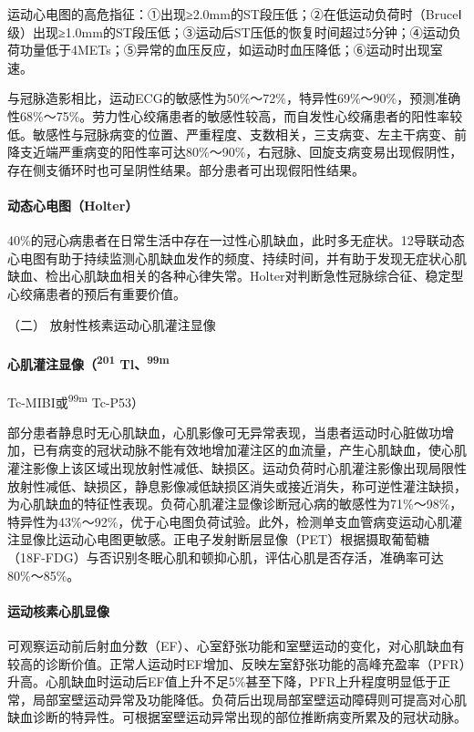 运动心电图的高危指征：①出现≥2.0mm的ST段压低；②在低运动负荷时（BruceⅠ级）出现≥1.0mm的ST段压低；③运动后ST压低的恢复时间超过5分钟；④运动负荷功量低于4METs；⑤异常的血压反应，如运动时血压降低；⑥运动时出现室速。

与冠脉造影相比，运动ECG的敏感性为50\%～72\%，特异性69\%～90\%，预测准确性68\%～75\%。劳力性心绞痛患者的敏感性较高，而自发性心绞痛患者的阳性率较低。敏感性与冠脉病变的位置、严重程度、支数相关，三支病变、左主干病变、前降支近端严重病变的阳性率可达80\%～90\%，右冠脉、回旋支病变易出现假阴性，存在侧支循环时也可呈阴性结果。部分患者可出现假阳性结果。

\paragraph{动态心电图（Holter）}

40\%的冠心病患者在日常生活中存在一过性心肌缺血，此时多无症状。12导联动态心电图有助于持续监测心肌缺血发作的频度、持续时间，并有助于发现无症状心肌缺血、检出心肌缺血相关的各种心律失常。Holter对判断急性冠脉综合征、稳定型心绞痛患者的预后有重要价值。

\hypertarget{text00309.htmlux5cux23CHP10-7-2-2-2}{}
（二） 放射性核素运动心肌灌注显像

\paragraph{心肌灌注显像（\textsuperscript{201} Tl、\textsuperscript{99m}}
Tc-MIBI或\textsuperscript{99m} Tc-P53）

部分患者静息时无心肌缺血，心肌影像可无异常表现，当患者运动时心脏做功增加，已有病变的冠状动脉不能有效地增加灌注区的血流量，产生心肌缺血，使心肌灌注影像上该区域出现放射性减低、缺损区。运动负荷时心肌灌注影像出现局限性放射性减低、缺损区，静息影像减低缺损区消失或接近消失，称可逆性灌注缺损，为心肌缺血的特征性表现。负荷心肌灌注显像诊断冠心病的敏感性为71\%～98\%，特异性为43\%～92\%，优于心电图负荷试验。此外，检测单支血管病变运动心肌灌注显像比运动心电图更敏感。正电子发射断层显像（PET）根据摄取葡萄糖（18F-FDG）与否识别冬眠心肌和顿抑心肌，评估心肌是否存活，准确率可达80\%～85\%。

\paragraph{运动核素心肌显像}

可观察运动前后射血分数（EF）、心室舒张功能和室壁运动的变化，对心肌缺血有较高的诊断价值。正常人运动时EF增加、反映左室舒张功能的高峰充盈率（PFR）升高。心肌缺血时运动后EF值上升不足5\%甚至下降，PFR上升程度明显低于正常，局部室壁运动异常及功能降低。负荷后出现局部室壁运动障碍则可提高对心肌缺血诊断的特异性。可根据室壁运动异常出现的部位推断病变所累及的冠状动脉。

